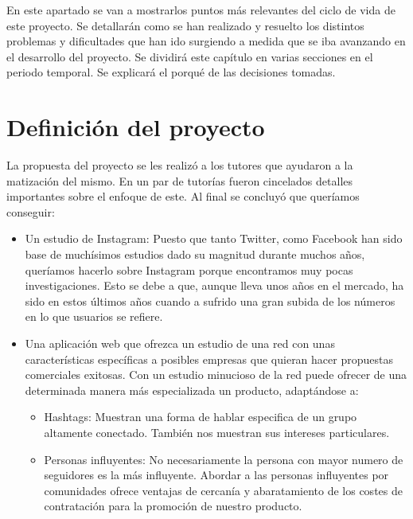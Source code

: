 
En este apartado se van a mostrarlos puntos más relevantes del ciclo de vida de este proyecto. Se detallarán como se han realizado y resuelto los distintos problemas y dificultades que han ido surgiendo a medida que se iba avanzando en el desarrollo del proyecto.
Se dividirá este capítulo en varias secciones en el periodo temporal. Se explicará el porqué de las decisiones tomadas.


\section{Definición del proyecto}
La propuesta del proyecto se les realizó a los tutores que ayudaron a la matización del mismo. En un par de tutorías fueron cincelados detalles importantes sobre el enfoque de este. Al final se concluyó que queríamos conseguir:
\begin{itemize}
	\item Un estudio de Instagram: Puesto que tanto Twitter, como Facebook han sido base de muchísimos estudios dado su magnitud durante muchos años, queríamos hacerlo sobre Instagram porque encontramos muy pocas investigaciones. Esto se debe a que, aunque lleva unos años en el mercado, ha sido en estos últimos años cuando a sufrido una gran subida de los números en lo que usuarios se refiere.
	\item Una aplicación web que ofrezca un estudio de una red con unas características específicas a posibles empresas que quieran hacer propuestas comerciales exitosas. Con un estudio minucioso de la red puede ofrecer de una determinada manera más especializada un producto, adaptándose a:
	\begin{itemize}
	    \item Hashtags: Muestran una forma de hablar especifica de un grupo altamente conectado. También nos muestran sus intereses particulares.
	    \item Personas influyentes: No necesariamente la persona con mayor numero de seguidores es la más influyente. Abordar a las personas influyentes por comunidades ofrece ventajas de cercanía y abaratamiento de los costes de contratación para la promoción de nuestro producto.
    \end{itemize}
\end{itemize}

